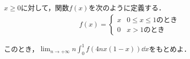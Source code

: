 \documentclass[../../main.tex]{subfiles}
\begin{document}
$x\ge 0$に対して，関数$f(x)$を次のように定義する．
\begin{align*}
  f(x)=
  \begin{cases}
    x & \text{$0\le x\le 1$のとき} \\
    0 & \text{$x>1$のとき}
  \end{cases}
\end{align*}

このとき，${\displaystyle \lim_{n\to +\infty}n\int_0^1 f(4nx(1-x))\dd x }$をもとめよ．
\end{document}
